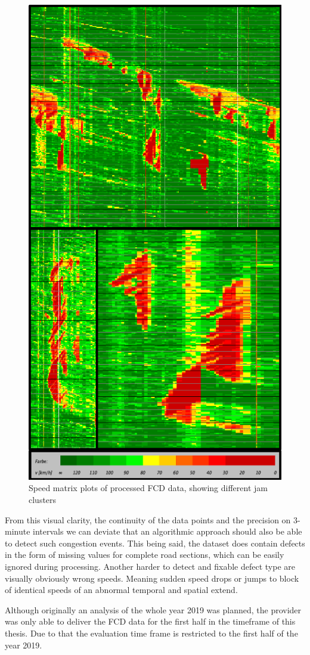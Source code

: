 \documentclass[a4paper,12pt]{report}
\begin{document}
\begin{figure}[h]
	\centering
	\includegraphics[scale=0.8]{./assets/SpeedMatrixPlot_mutiple}
	\caption{Speed matrix plots of processed FCD data, showing different jam clusters}
	\label{img:speedMatrixPlot_mutipleMixedClusters}
\end{figure}

\par From this visual clarity, the continuity of the data points and the precision on 3-minute intervals we can deviate that an algorithmic approach should also be able to detect such congestion events. This being said, the dataset does contain defects in the form of missing values for complete road sections, which can be easily ignored during processing. Another harder to detect and fixable defect type are visually obviously wrong speeds. Meaning sudden speed drops or jumps to block of identical speeds of an abnormal temporal and spatial extend. 
\par Although originally an analysis of the whole year 2019 was planned, the provider was only able to deliver the FCD data for the first half in the timeframe of this thesis. Due to that the evaluation time frame is restricted to the first half of the year 2019.
\end{document}
